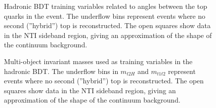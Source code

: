 \begin{figure}[htbp]
  \centering
  \caption{Hadronic BDT training variables related to angles between the top quarks in the event. The underflow bins represent events where no second (''hybrid'') top is reconstructed. The open squares show data in the NTI sideband region, giving an approximation of the shape of the continuum background. }
  \label{fig:hadvbls4}
\end{figure}

\begin{figure}[htbp]
  \centering
  \caption{Multi-object invariant masses used as training variables in the hadronic BDT. The underflow bins in $m_{t2H}$ and $m_{t1t2}$ represent events where no second (''hybrid'') top is reconstructed. The open squares show data in the NTI sideband region, giving an approximation of the shape of the continuum background. }
  \label{fig:hadvbls5}
\end{figure}

